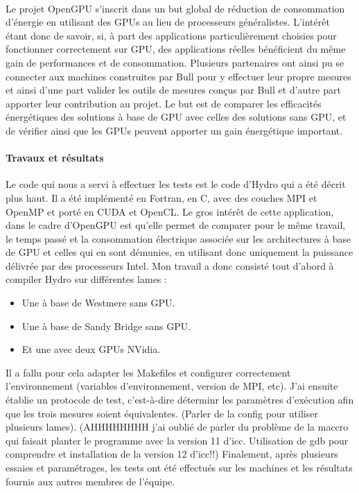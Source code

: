 \documentclass[11pt]{article}
\begin{document}
				\paragraph{}
				Le projet OpenGPU s'inscrit dans un but global de réduction de consommation d’énergie en utilisant des GPUs 
				au lieu de processeurs généralistes. L'intérêt étant donc de savoir, si, à part des applications particulièrement 
				choisies pour fonctionner correctement sur GPU, des applications réelles bénéficient du même gain de performances 
				et de consommation. \newline
				Plusieurs partenaires ont ainsi pu se connecter aux machines construites par Bull pour y effectuer leur propre 
				mesures et ainsi d'une part valider les outils de mesures conçus par Bull et d'autre part apporter leur contribution 
				au projet. \newline
				Le but est de comparer les efficacités énergétiques des solutions à base de GPU avec celles des solutions sans 
				GPU, et de vérifier ainsi que les GPUs peuvent apporter un gain énergétique important.
				\paragraph{Travaux et résultats}
				Le code qui nous a servi à effectuer les tests est le code d'Hydro qui a été décrit plus haut. Il a été 
				implémenté en Fortran, en C, avec des couches MPI et OpenMP et porté en CUDA et OpenCL.
				Le gros intérêt de cette application, dans le cadre d'OpenGPU est qu'elle permet de comparer pour le même 
				travail, le temps passé et la consommation électrique associée sur les architectures à base de GPU et celles 
				qui en sont démunies, en utilisant donc uniquement la puissance délivrée par des processeurs Intel.
				Mon travail a donc consisté tout d'abord à compiler Hydro sur différentes lames : \newline
				\begin{itemize}
				\item Une à base de Westmere sans GPU.
				\item Une à base de Sandy Bridge sans GPU.
				\item Et une avec deux GPUs NVidia. \newline
				\end{itemize}
				Il a fallu pour cela adapter les Makefiles et configurer correctement l'environnement (variables 
				d'environnement, version de MPI, etc). 
				J'ai ensuite établie un protocole de test, c'est-à-dire déterminr les paramètres d'exécution afin que les trois 
				mesures soient équivalentes. (Parler de la config pour utiliser plusieurs lames). \newline
				(AHHHHHHHH j'ai oublié de parler du problème de la maccro qui faisait planter le programme avec la version 11
				d'icc. Utilisation de gdb pour comprendre et installation de la version 12 d'icc!!) \newline
				Finalement, après plusieurs essaies et paramétrages, les tests ont été effectués 
				sur les machines et les résultats fournis aux autres membres de l'équipe.
\end{document}
